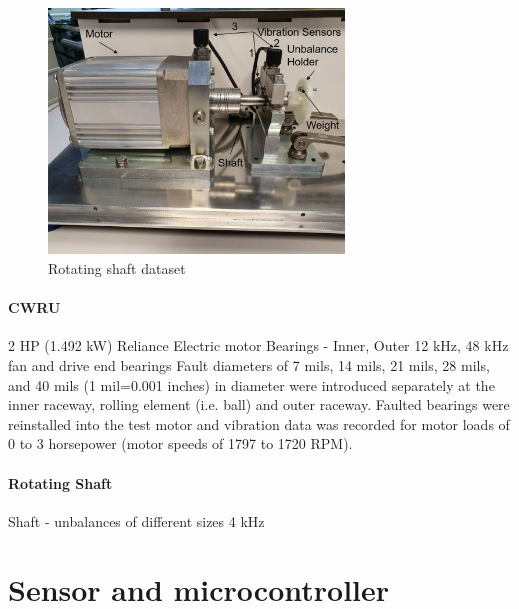 \begin{figure}[h]
\centering
\includegraphics[width=0.7\textwidth]{assets/rotating-shaft.jpg}
\caption{Rotating shaft dataset}
\label{fig:rotating-shaft}
\end{figure}


\paragraph{CWRU}
2 HP (1.492 kW) Reliance Electric motor
Bearings - Inner, Outer
12 kHz, 48 kHz
fan and drive end bearings
Fault diameters of 7 mils, 14 mils, 21 mils, 28 mils, and 40 mils (1 mil=0.001 inches) in diameter were introduced separately at the inner raceway, rolling element (i.e. ball) and outer raceway. 
Faulted bearings were reinstalled into the test motor and vibration data was recorded for motor loads of 0 to 3 horsepower (motor speeds of 1797 to 1720 RPM).

\cite{jamil_feature-based_2021}
\cite{mey_machine_2020}

\paragraph{Rotating Shaft}
Shaft -  unbalances of different sizes
4 kHz

\section{Sensor and microcontroller}
\cite{hu_intelligent_2012} 
